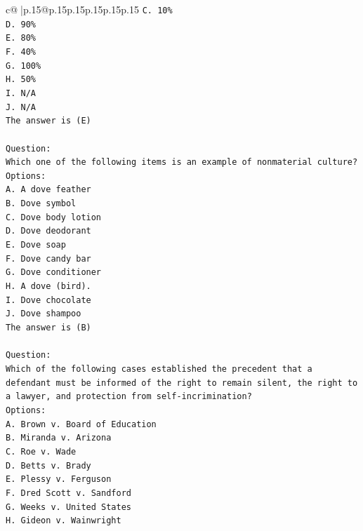 \documentclass{article}
\begin{document}
{\begin{supertabular}{c@{$\;$}|p{.15\linewidth}@{}p{.15\linewidth}p{.15\linewidth}p{.15\linewidth}p{.15\linewidth}p{.15\linewidth}}
{{{\texttt{C. 10\%} \\
\texttt{D. 90\%} \\
\texttt{E. 80\%} \\
\texttt{F. 40\%} \\
\texttt{G. 100\%} \\
\texttt{H. 50\%} \\
\texttt{I. N/A} \\
\texttt{J. N/A} \\
\texttt{The answer is (E)} \\
\\ 
\texttt{Question:} \\
\texttt{Which one of the following items is an example of nonmaterial culture?} \\
\texttt{Options:} \\
\texttt{A. A dove feather} \\
\texttt{B. Dove symbol} \\
\texttt{C. Dove body lotion} \\
\texttt{D. Dove deodorant} \\
\texttt{E. Dove soap} \\
\texttt{F. Dove candy bar} \\
\texttt{G. Dove conditioner} \\
\texttt{H. A dove (bird).} \\
\texttt{I. Dove chocolate} \\
\texttt{J. Dove shampoo} \\
\texttt{The answer is (B)} \\
\\ 
\texttt{Question:} \\
\texttt{Which of the following cases established the precedent that a defendant must be informed of the right to remain silent, the right to a lawyer, and protection from self{-}incrimination?} \\
\texttt{Options:} \\
\texttt{A. Brown v. Board of Education} \\
\texttt{B. Miranda v. Arizona} \\
\texttt{C. Roe v. Wade} \\
\texttt{D. Betts v. Brady} \\
\texttt{E. Plessy v. Ferguson} \\
\texttt{F. Dred Scott v. Sandford} \\
\texttt{G. Weeks v. United States} \\
\texttt{H. Gideon v. Wainwright} \\
}}}
\end{supertabular}}
\end{document}
